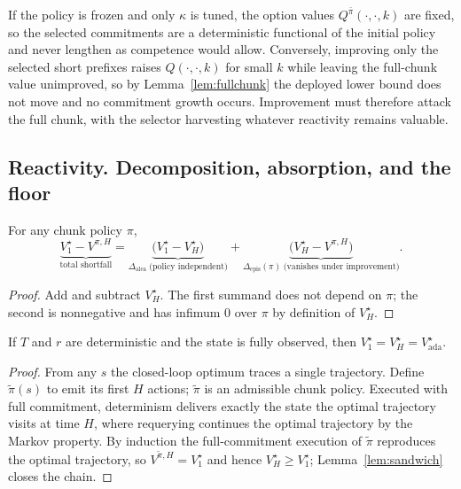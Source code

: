 \begin{remark}
\label{rem:frozen}
If the policy is frozen and only $\kappa$ is tuned, the option values
$Q^{\bar\pi}(\cdot,\cdot,k)$ are fixed, so the selected commitments are a deterministic functional
of the initial policy and never lengthen as competence would allow. Conversely, improving only the
selected short prefixes raises $Q(\cdot,\cdot,k)$ for small $k$ while leaving the full-chunk value
unimproved, so by Lemma~\ref{lem:fullchunk} the deployed lower bound does not move and no
commitment growth occurs. Improvement must therefore attack the full chunk, with the selector
harvesting whatever reactivity remains valuable.
\end{remark}

\subsection{Reactivity. Decomposition, absorption, and the floor}
\label{app:reactivity}

\begin{theorem}
\label{thm:decomp}
For any chunk policy $\pi$,
\[
\underbrace{V^{\star}_{1}-V^{\pi,H}}_{\text{total shortfall}}
=\underbrace{\bigl(V^{\star}_{1}-V^{\star}_{H}\bigr)}_{\Delta_{\mathrm{alea}}\;\text{(policy independent)}}
+\underbrace{\bigl(V^{\star}_{H}-V^{\pi,H}\bigr)}_{\Delta_{\mathrm{epis}}(\pi)\;\text{(vanishes under improvement)}} .
\]
\end{theorem}
\begin{proof}
Add and subtract $V^{\star}_{H}$. The first summand does not depend on $\pi$; the second is
nonnegative and has infimum $0$ over $\pi$ by definition of $V^{\star}_{H}$.
\end{proof}

\begin{theorem}
\label{thm:determinism}
If $T$ and $r$ are deterministic and the state is fully observed, then
$V^{\star}_{1}=V^{\star}_{H}=V^{\star}_{\mathrm{ada}}$.
\end{theorem}
\begin{proof}
From any $s$ the closed-loop optimum traces a single trajectory. Define $\tilde\pi(s)$ to emit its
first $H$ actions; $\tilde\pi$ is an admissible chunk policy. Executed with full commitment,
determinism delivers exactly the state the optimal trajectory visits at time $H$, where requerying
continues the optimal trajectory by the Markov property. By induction the full-commitment
execution of $\tilde\pi$ reproduces the optimal trajectory, so $V^{\tilde\pi,H}=V^{\star}_{1}$ and
hence $V^{\star}_{H}\ge V^{\star}_{1}$; Lemma~\ref{lem:sandwich} closes the chain.
\end{proof}

